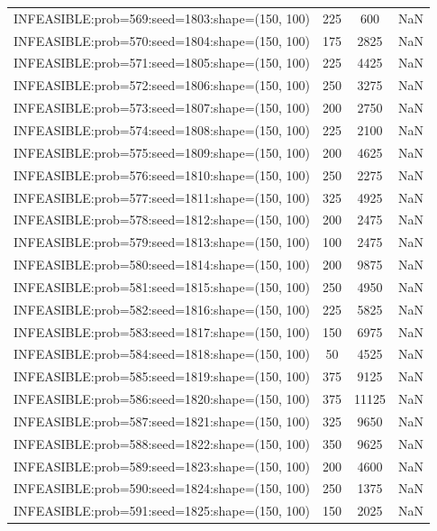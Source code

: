 \begin{longtable}{lccc}
INFEASIBLE:prob=569:seed=1803:shape=(150, 100) &      225 &   600 &    NaN \\
INFEASIBLE:prob=570:seed=1804:shape=(150, 100) &      175 &  2825 &    NaN \\
INFEASIBLE:prob=571:seed=1805:shape=(150, 100) &      225 &  4425 &    NaN \\
INFEASIBLE:prob=572:seed=1806:shape=(150, 100) &      250 &  3275 &    NaN \\
INFEASIBLE:prob=573:seed=1807:shape=(150, 100) &      200 &  2750 &    NaN \\
INFEASIBLE:prob=574:seed=1808:shape=(150, 100) &      225 &  2100 &    NaN \\
INFEASIBLE:prob=575:seed=1809:shape=(150, 100) &      200 &  4625 &    NaN \\
INFEASIBLE:prob=576:seed=1810:shape=(150, 100) &      250 &  2275 &    NaN \\
INFEASIBLE:prob=577:seed=1811:shape=(150, 100) &      325 &  4925 &    NaN \\
INFEASIBLE:prob=578:seed=1812:shape=(150, 100) &      200 &  2475 &    NaN \\
INFEASIBLE:prob=579:seed=1813:shape=(150, 100) &      100 &  2475 &    NaN \\
INFEASIBLE:prob=580:seed=1814:shape=(150, 100) &      200 &  9875 &    NaN \\
INFEASIBLE:prob=581:seed=1815:shape=(150, 100) &      250 &  4950 &    NaN \\
INFEASIBLE:prob=582:seed=1816:shape=(150, 100) &      225 &  5825 &    NaN \\
INFEASIBLE:prob=583:seed=1817:shape=(150, 100) &      150 &  6975 &    NaN \\
INFEASIBLE:prob=584:seed=1818:shape=(150, 100) &       50 &  4525 &    NaN \\
INFEASIBLE:prob=585:seed=1819:shape=(150, 100) &      375 &  9125 &    NaN \\
INFEASIBLE:prob=586:seed=1820:shape=(150, 100) &      375 & 11125 &    NaN \\
INFEASIBLE:prob=587:seed=1821:shape=(150, 100) &      325 &  9650 &    NaN \\
INFEASIBLE:prob=588:seed=1822:shape=(150, 100) &      350 &  9625 &    NaN \\
INFEASIBLE:prob=589:seed=1823:shape=(150, 100) &      200 &  4600 &    NaN \\
INFEASIBLE:prob=590:seed=1824:shape=(150, 100) &      250 &  1375 &    NaN \\
INFEASIBLE:prob=591:seed=1825:shape=(150, 100) &      150 &  2025 &    NaN \\

\end{longtable}
